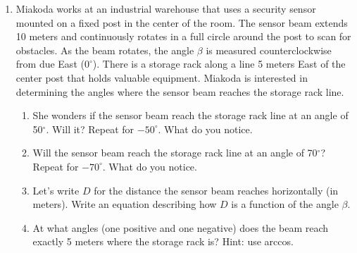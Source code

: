 \begin{enumerate}
\begin{center}
\end{center}
\begin{enumerate}
    \item Estimate the $y$-coordinates of each of the four points where the glass panels meet the circle.  Don't forget the units. Be sure to include negative values where appropriate.
    \item What do the $y$-coordinates of the points mean in the story?  
    \item Glass Panel 1 makes an angle of 80$^\circ$ with the positive $x$-axis.  Use that information to determine the angle for Glass Panels 2, 3, and 4.
    \item Write an equation describing how $Y$, the $y$-coordinate of the point on the unit circle (in meters), depends on the angle $\phi$ (in degrees).  Hint: the radius of the circle is 1 meter.
    \item Use your equation to check your earlier estimates.
\end{enumerate}

\item Miakoda works at an industrial warehouse that uses a security sensor mounted on a fixed post in the center of the room. The sensor beam extends 10 meters and continuously rotates in a full circle around the post to scan for obstacles.  As the beam rotates, the angle $\beta$ is measured counterclockwise from due East ($0^\circ$). There is a storage rack along a line 5 meters East of the center post that holds valuable equipment. Miakoda is interested in determining the angles where the sensor beam reaches the storage rack line.
\begin{enumerate}
    \item She wonders if the sensor beam reach the storage rack line at an angle of 50$^\circ$.  Will it?  Repeat for $-50^\circ$.  What do you notice.
    \item Will the sensor beam reach the storage rack line at an angle of 70$^\circ$?  Repeat for $-70^\circ$.  What do you notice.
    \item Let's write $D$ for the distance the sensor beam reaches horizontally (in meters). Write an equation describing how $D$ is a function of the angle $\beta$.
    \item At what angles (one positive and one negative) does the beam reach exactly 5 meters where the storage rack is?  Hint: use arccos.
\end{enumerate}


\end{enumerate}
